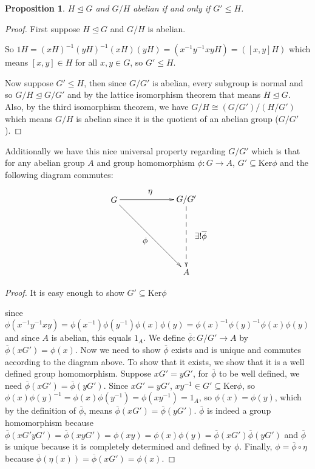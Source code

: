\documentclass[11pt]{article}
\theoremstyle{definition}
\theoremstyle{plain}
\theoremstyle{plain}
\newtheorem{prop}{Proposition}
\theoremstyle{plain}
\begin{document}
\begin{prop}
$H \trianglelefteq G$ and $G/H$ abelian if and only if $G' \leq H$.
\end{prop}

\begin{proof}
First suppose $H \trianglelefteq G$ and $G/H$ is abelian. 

So $1H=(xH)^{-1}(yH)^{-1}(xH)(yH)=(x^{-1}y^{-1}xyH)=([x,y]H)$ which means $[x,y] \in H$ for all $x,y \in G$, so $G' \leq H$.

Now suppose $G' \leq H$, then since $G/G'$ is abelian, every subgroup is normal and so $G/H \trianglelefteq G/G'$ and by the lattice isomorphism theorem that means $H \trianglelefteq G$. Also, by the third isomorphism theorem, we have $G/H \cong (G/G')/(H/G')$ which means $G/H$ is abelian since it is the quotient of an abelian group ($G/G'$).
\end{proof}

Additionally we have this nice universal property regarding $G/G'$ which is that for any abelian group $A$ and group homomorphism $\phi : G \to A$, $G' \subseteq \text{Ker}\phi$ and the following diagram commutes:

\begin{equation*}
\begin{xy}
(0,0)*+{G}="G"; (30,0)*+{G/G'}="gprime"; (30,-30)*+{A}="A";
{\ar "G";"gprime"}?*!/_3mm/{\eta};
{\ar "G";"A"}?*!/^3mm/{\phi};
{\ar@{-->} "gprime";"A"}?*!/_6mm/{\exists ! \overline{\phi}}
\end{xy}
\end{equation*}

\begin{proof}
It is easy enough to show $G' \subseteq \text{Ker}\phi$ 

since $\phi(x^{-1}y^{-1}xy)=\phi(x^{-1})\phi(y^{-1})\phi(x)\phi(y)=\phi(x)^{-1}\phi(y)^{-1}\phi(x)\phi(y)$ and since $A$ is abelian, this equals $1_{A}$. We define $\overline{\phi} : G/G' \to A$ by $\overline{\phi}(xG')=\phi(x)$. Now we need to show $\overline{\phi}$ exists and is unique and commutes according to the diagram above. To show that it exists, we show that it is a well defined group homomorphism. Suppose $xG'=yG'$, for $\overline{\phi}$ to be well defined, we need $\overline{\phi}(xG')=\overline{\phi}(yG')$. Since $xG'=yG'$, $xy^{-1} \in G' \subseteq \text{Ker}\phi$, so $\phi(x)\phi(y)^{-1}=\phi(x)\phi(y^{-1})=\phi(xy^{-1})=1_{A}$, so $\phi(x)=\phi(y)$, which by the definition of $\overline{\phi}$, means $\overline{\phi}(xG')=\overline{\phi}(yG')$. $\overline{\phi}$ is indeed a group homomorphism because $\overline{\phi}(xG'yG')=\overline{\phi}(xyG')=\phi(xy)=\phi(x)\phi(y)=\overline{\phi}(xG')\overline{\phi}(yG')$ and $\overline{\phi}$ is unique because it is completely determined and defined by $\phi$. Finally, $\phi = \overline{\phi} \circ \eta$ because $\overline{\phi}(\eta(x))=\overline{\phi}(xG')=\phi(x)$.
\end{proof}

\nocite{*}


\end{document}
